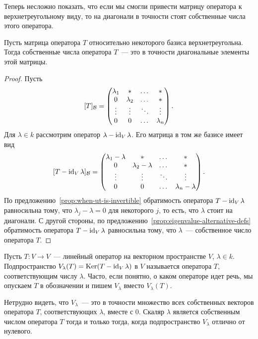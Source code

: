 Теперь несложно показать, что если мы смогли привести матрицу
оператора к верхнетреугольному виду, то на диагонали в точности стоят
собственные числа этого оператора.
\begin{proposition}
Пусть матрица оператора $T$ относительно некоторого базиса
верхнетреугольна. Тогда собственные числа оператора $T$~--- это
в точности диагональные элементы этой матрицы.
\end{proposition}
\begin{proof}
Пусть
$$
[T]_{\mathcal B} = \begin{pmatrix}
\lambda_1 & * & \dots & * \\
0 & \lambda_2 & \dots & * \\
\vdots & \vdots & \ddots & \vdots \\
0 & 0 & \dots & \lambda_n
\end{pmatrix}.
$$
Для $\lambda\in k$ рассмотрим оператор $\lambda - \operatorname{id}_V\lambda$.
Его матрица в том же базисе имеет вид
$$
[T -\operatorname{id}_V\lambda]_{\mathcal B} = \begin{pmatrix}
\lambda_1-\lambda & * & \dots & * \\
0 & \lambda_2-\lambda & \dots & * \\
\vdots & \vdots & \ddots & \vdots \\
0 & 0 & \dots & \lambda_n-\lambda
\end{pmatrix}.
$$
По предложению~\ref{prop:when-ut-is-invertible} обратимость
оператора $T-\operatorname{id}_V\lambda$ равносильна тому, что $\lambda_j-\lambda=0$
для некоторого $j$, то есть, что $\lambda$ стоит на диагонали.
С другой стороны, по предложению~\ref{prop:eigenvalue-alternative-defs}
обратимость оператора $T-\operatorname{id}_V\lambda$ равносильна тому, что
$\lambda$~--- собственное число оператора $T$.
\end{proof}

\begin{definition}
Пусть $T\colon V\to V$~--- линейный оператор на векторном пространстве
$V$, $\lambda\in k$. Подпространство
$V_\lambda(T) = \operatorname{Ker}(T-\operatorname{id}_V\lambda)$ в $V$ называется
 оператора $T$, соответствующим
числу $\lambda$. Часто, если понятно, о каком операторе идет речь,
мы опускаем $T$ в обозначении и пишем $V_\lambda$ вместо $V_\lambda(T)$.
\end{definition}

Нетрудно видеть, что $V_\lambda$~--- это в точности множество
всех собственных векторов оператора $T$, соответствующих $\lambda$,
вместе с $0$. Скаляр $\lambda$ является собственным числом
оператора $T$ тогда и только тогда, когда подпространство
$V_\lambda$ отлично от нулевого.

